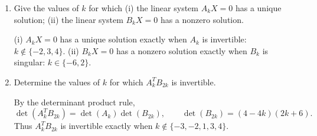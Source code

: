 \begin{enumerate}[label=\alph*)]
\item Give the values of $k$ for which (i) the linear system $A_kX=0$ has a unique solution; (ii) the linear system $B_kX=0$ has a nonzero solution.

\begin{answer}
(i) $A_kX=0$ has a unique solution exactly when $A_k$ is invertible:
$k\notin\{-2,3,4\}$. (ii) $B_kX=0$ has a nonzero solution exactly when
$B_k$ is singular: $k\in\{-6,2\}$.
\end{answer}

\item Determine the values of $k$ for which $A_k^TB_{2k}$ is invertible.

\begin{answer}
By the determinant product rule,
\[
 \det(A_k^TB_{2k})=\det(A_k)\det(B_{2k}),\qquad
 \det(B_{2k})=(4-4k)(2k+6).
\]
Thus $A_k^TB_{2k}$ is invertible exactly when
$k\notin\{-3,-2,1,3,4\}$.
\end{answer}
\end{enumerate}
